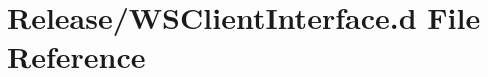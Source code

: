 \hypertarget{Release_2WSClientInterface_8d}{}\section{Release/\+W\+S\+Client\+Interface.d File Reference}
\label{Release_2WSClientInterface_8d}
